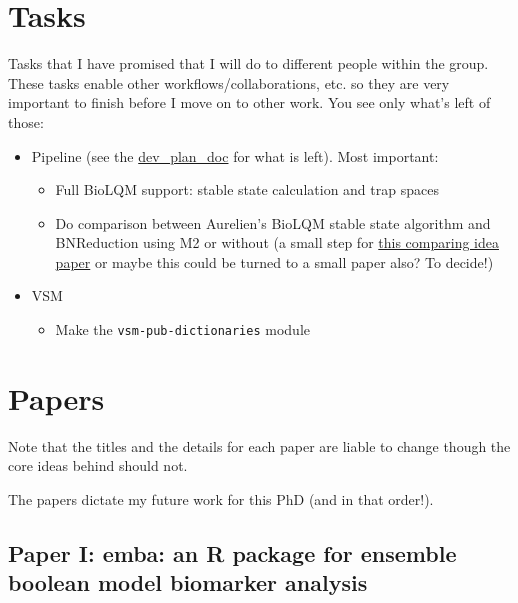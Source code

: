 \documentclass[12pt,]{book}
\providecommand{\tightlist}{%
  \setlength{\itemsep}{0pt}\setlength{\parskip}{0pt}}
\begin{document}
\hypertarget{tasks}{%
\section{Tasks}\label{tasks}}

Tasks that I have promised that I will do to different people within the group.
These tasks enable other workflows/collaborations, etc. so they are very
important to finish before I move on to other work. You see only what's left of
those:

\begin{itemize}
\tightlist
\item
  Pipeline (see the \href{https://docs.google.com/document/d/1OUupR0b-28YB9pVAww77RMecnFN6A39MYjXMjljmvG4/edit?usp=sharing}{dev\_plan\_doc} for what is left). Most important:

  \begin{itemize}
  \tightlist
  \item
    Full BioLQM support: stable state calculation and trap spaces
  \item
    Do comparison between Aurelien's BioLQM stable state algorithm and
    BNReduction using M2 or without (a small step for \protect\hyperlink{comp}{this comparing idea paper} or
    maybe this could be turned to a small paper also? To decide!)
  \end{itemize}
\item
  VSM

  \begin{itemize}
  \tightlist
  \item
    Make the \texttt{vsm-pub-dictionaries} module
  \end{itemize}
\end{itemize}

\hypertarget{papers}{%
\section{Papers}\label{papers}}

Note that the titles and the details for each paper are liable to change though the core ideas behind should not.

The papers dictate my future work for this PhD (and in that order!).

\hypertarget{paper-i-emba-an-r-package-for-ensemble-boolean-model-biomarker-analysis}{%
\subsection{Paper I: emba: an R package for ensemble boolean model biomarker analysis}\label{paper-i-emba-an-r-package-for-ensemble-boolean-model-biomarker-analysis}}
\end{document}
